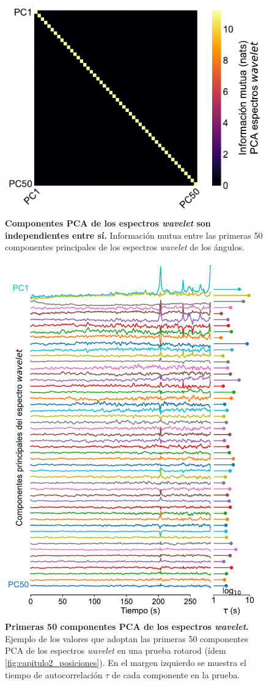 \begin{appendix}
    \begin{figure}[htbp]
        \centering
        \includegraphics[width=0.7\linewidth]{figuras/capitulo4/mi_pca_wav.pdf}
        \caption{\textbf{Componentes PCA de los espectros \textit{wavelet} son independientes entre sí.}
            Información mutua entre las primeras 50 componentes principales de los espectros \textit{wavelet} de los ángulos.}
        \label{fig:capitulo4_mi_pca_wav}
    \end{figure}

    \begin{figure}[htbp]
        \centering
        \includegraphics[width=0.7\linewidth]{figuras/capitulo4/componentes_pca.pdf}
        \caption{\textbf{Primeras 50 componentes PCA de los espectros \textit{wavelet}.}
            Ejemplo de los valores que adoptan las primeras 50 componentes PCA de los espectros \textit{wavelet} en una prueba rotarod (ídem \autoref{fig:capitulo2_posiciones}).
            En el margen izquierdo se muestra el tiempo de autocorrelación $\tau$ de cada componente en la prueba.}
        \label{fig:capitulo4_componentes_pca}
    \end{figure}


\end{appendix}
